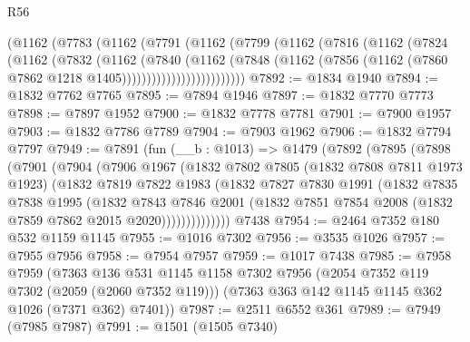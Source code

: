 \begin{lexlean}{R56}
\begin{coremodule}
              (@1162
                (@7783
                  (@1162
                    (@7791
                      (@1162
                        (@7799
                          (@1162
                            (@7816
                              (@1162
                                (@7824
                                  (@1162
                                    (@7832
                                      (@1162
                                        (@7840
                                          (@1162
                                            (@7848
                                              (@1162
                                                (@7856
                                                  (@1162
                                                    (@7860
                                                      @7862
                                                      @1218
                                                      @1405)))))))))))))))))))))))))
@7892 := @1834 @1940
@7894 := @1832 @7762 @7765
@7895 := @7894 @1946
@7897 := @1832 @7770 @7773
@7898 := @7897 @1952
@7900 := @1832 @7778 @7781
@7901 := @7900 @1957
@7903 := @1832 @7786 @7789
@7904 := @7903 @1962
@7906 := @1832 @7794 @7797
@7949 := @7891
    (fun (__b : @1013) =>
    @1479
      (@7892
        (@7895
          (@7898
            (@7901
              (@7904
                (@7906
                  @1967
                  (@1832
                    @7802
                    @7805
                    (@1832 @7808 @7811 @1973 @1923)
                    (@1832
                      @7819
                      @7822
                      @1983
                      (@1832
                        @7827
                        @7830
                        @1991
                        (@1832
                          @7835
                          @7838
                          @1995
                          (@1832
                            @7843
                            @7846
                            @2001
                            (@1832 @7851 @7854 @2008 (@1832 @7859 @7862 @2015 @2020))))))))))))))
    @7438
@7954 := @2464 @7352 @180 @532 @1159 @1145
@7955 := @1016 @7302
@7956 := @3535 @1026
@7957 := @7955 @7956
@7958 := @7954 @7957
@7959 := @1017 @7438
@7985 := @7958
    @7959
    (@7363
      @136
      @531
      @1145
      @1158
      @7302
      @7956
      (@2054 @7352 @119 @7302 (@2059 (@2060 @7352 @119)))
      (@7363 @363 @142 @1145 @1145 @362 @1026 (@7371 @362) @7401))
@7987 := @2511 @6552 @361
@7989 := @7949 (@7985 @7987)
@7991 := @1501 (@1505 @7340)

\end{coremodule}
\end{lexlean}
